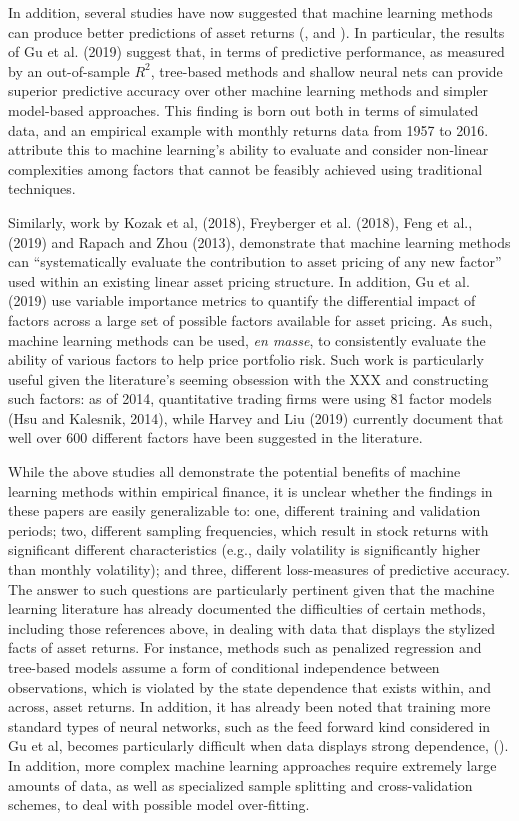 \documentclass{article}
\begin{document}
In addition, several studies have now suggested that machine learning methods can produce better predictions of asset returns (\cite{gu_empirical_2018}, \cite{hsu_finding_2014} and \cite{feng_deep_2018}). In particular, the results of Gu et al. (2019) suggest that, in terms of predictive performance, as measured by an out-of-sample $R^2$,  tree-based methods and shallow neural nets can provide superior predictive accuracy over other machine learning methods and simpler model-based approaches. This finding is born out both in terms of simulated data, and an empirical example with monthly returns data from 1957 to 2016. \cite{gu_empirical_2018} attribute this to machine learning's ability to evaluate and consider non-linear complexities among factors that cannot be feasibly achieved using traditional techniques. 

Similarly, work by Kozak et al, (2018), Freyberger et al. (2018), Feng et al., (2019) and Rapach and Zhou (2013), demonstrate that machine learning methods can ``systematically evaluate the contribution to asset pricing of any new factor'' used within an existing linear asset pricing structure. In addition, Gu et al. (2019) use variable importance metrics to quantify the differential impact of factors across a large set of possible factors available for asset pricing. As such, machine learning methods can be used, \textit{en masse}, to consistently evaluate the ability of various factors to help price portfolio risk. Such work is particularly useful given the literature's seeming obsession with the XXX and constructing such factors: as of 2014, quantitative trading firms were using 81 factor models (Hsu and Kalesnik, 2014), while Harvey and Liu (2019) currently document that well over 600 different factors have been suggested in the literature. 

While the above studies all demonstrate the potential benefits of machine learning methods within empirical finance, it is unclear whether the findings in these papers are easily generalizable to: one, different training and validation periods; two, different sampling frequencies, which result in stock returns with significant different characteristics (e.g., daily volatility is significantly higher than monthly volatility); and three, different loss-measures of predictive accuracy. The answer to such questions are particularly pertinent given that the machine learning literature has already documented the difficulties of certain methods, including those references above, in dealing with data that displays the stylized facts of asset returns. For instance, methods such as penalized regression and tree-based models assume a form of conditional independence between observations, which is violated by the state dependence that exists within, and across, asset returns. In addition, it has already been noted that training more standard types of neural networks, such as the feed forward kind considered in Gu et al, becomes particularly difficult when data displays strong dependence, (\cite{bengio_learning_1994}). In addition, more complex machine learning approaches require extremely large amounts of data, as well as specialized sample splitting and cross-validation schemes, to deal with possible model over-fitting. 
\end{document}
